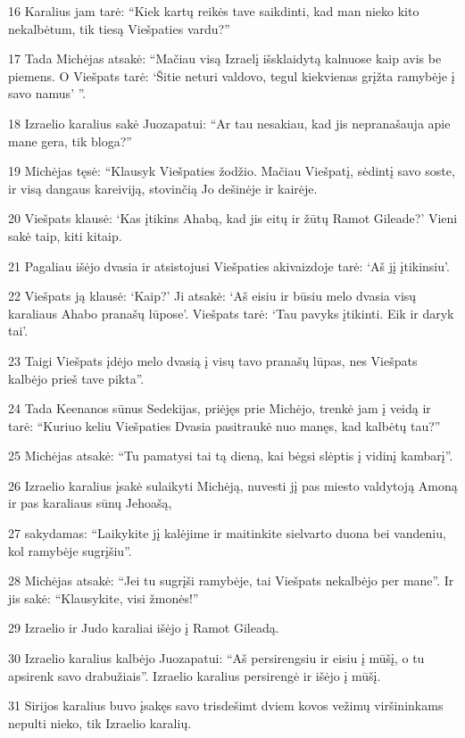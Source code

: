 \par 16 Karalius jam tarė: “Kiek kartų reikės tave saikdinti, kad man nieko kito nekalbėtum, tik tiesą Viešpaties vardu?” 
\par 17 Tada Michėjas atsakė: “Mačiau visą Izraelį išsklaidytą kalnuose kaip avis be piemens. O Viešpats tarė: ‘Šitie neturi valdovo, tegul kiekvienas grįžta ramybėje į savo namus’ ”. 
\par 18 Izraelio karalius sakė Juozapatui: “Ar tau nesakiau, kad jis nepranašauja apie mane gera, tik bloga?” 
\par 19 Michėjas tęsė: “Klausyk Viešpaties žodžio. Mačiau Viešpatį, sėdintį savo soste, ir visą dangaus kareiviją, stovinčią Jo dešinėje ir kairėje. 
\par 20 Viešpats klausė: ‘Kas įtikins Ahabą, kad jis eitų ir žūtų Ramot Gileade?’ Vieni sakė taip, kiti­ kitaip. 
\par 21 Pagaliau išėjo dvasia ir atsistojusi Viešpaties akivaizdoje tarė: ‘Aš jį įtikinsiu’. 
\par 22 Viešpats ją klausė: ‘Kaip?’ Ji atsakė: ‘Aš eisiu ir būsiu melo dvasia visų karaliaus Ahabo pranašų lūpose’. Viešpats tarė: ‘Tau pavyks įtikinti. Eik ir daryk tai’. 
\par 23 Taigi Viešpats įdėjo melo dvasią į visų tavo pranašų lūpas, nes Viešpats kalbėjo prieš tave pikta”. 
\par 24 Tada Keenanos sūnus Sedekijas, priėjęs prie Michėjo, trenkė jam į veidą ir tarė: “Kuriuo keliu Viešpaties Dvasia pasitraukė nuo manęs, kad kalbėtų tau?” 
\par 25 Michėjas atsakė: “Tu pamatysi tai tą dieną, kai bėgsi slėptis į vidinį kambarį”. 
\par 26 Izraelio karalius įsakė sulaikyti Michėją, nuvesti jį pas miesto valdytoją Amoną ir pas karaliaus sūnų Jehoašą, 
\par 27 sakydamas: “Laikykite jį kalėjime ir maitinkite sielvarto duona bei vandeniu, kol ramybėje sugrįšiu”. 
\par 28 Michėjas atsakė: “Jei tu sugrįši ramybėje, tai Viešpats nekalbėjo per mane”. Ir jis sakė: “Klausykite, visi žmonės!” 
\par 29 Izraelio ir Judo karaliai išėjo į Ramot Gileadą. 
\par 30 Izraelio karalius kalbėjo Juozapatui: “Aš persirengsiu ir eisiu į mūšį, o tu apsirenk savo drabužiais”. Izraelio karalius persirengė ir išėjo į mūšį. 
\par 31 Sirijos karalius buvo įsakęs savo trisdešimt dviem kovos vežimų viršininkams nepulti nieko, tik Izraelio karalių. 
